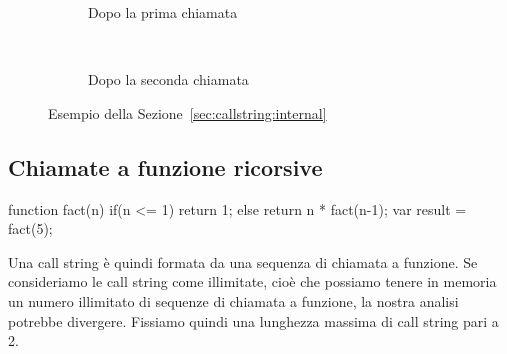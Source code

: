\begin{figure}[htbp]
    \centering
    \begin{subfigure}{\linewidth}
        \centering
        \caption{Dopo la prima chiamata}
    \end{subfigure}\\[4em]
    \begin{subfigure}{\linewidth}
        \centering
        \caption{Dopo la seconda chiamata}
    \end{subfigure}
    \caption{Esempio della Sezione~\ref{sec:callstring:internal}}
    \label{fig:realizzazione:callstring:internal}
\end{figure}

\subsection{Chiamate a funzione ricorsive}\label{sec:realizzazione:recursive}
\begin{javascriptcode}
function fact(n) {
    if(n <= 1) {
        return 1;
    } else {
        return n * fact(n-1);
    }
}
var result = fact(5);
\end{javascriptcode}
Una call string è quindi formata da una sequenza di chiamata a funzione. Se consideriamo le call string come illimitate, cioè che possiamo tenere in memoria un numero illimitato di sequenze di chiamata a funzione, la nostra analisi potrebbe divergere. Fissiamo quindi una lunghezza massima di call string pari a 2. 

